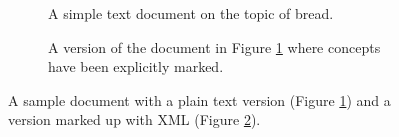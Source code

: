\documentclass[12pt]{article}
\begin{document}
\begin{figure}
    \centering
    
    \begin{subfigure}{\linewidth}
        \lstset{breaklines=true, numbers=none, breakindent=0mm}
        
        \caption{A simple text document on the topic of bread.}
        \label{fig:sample_txt_document}
    \end{subfigure}
    
    \vspace{5mm}
    
    \begin{subfigure}{\linewidth}
        \centering
        
        \caption{A version of the document in Figure \ref{fig:sample_txt_document} where concepts have been explicitly marked.}
        \label{fig:sample_xml_document}
    \end{subfigure}
    
    \caption{A sample document with a plain text version (Figure \ref{fig:sample_txt_document}) and a version marked up with XML (Figure \ref{fig:sample_xml_document}).}
    \label{fig:sample document}
\end{figure}

\end{document}
